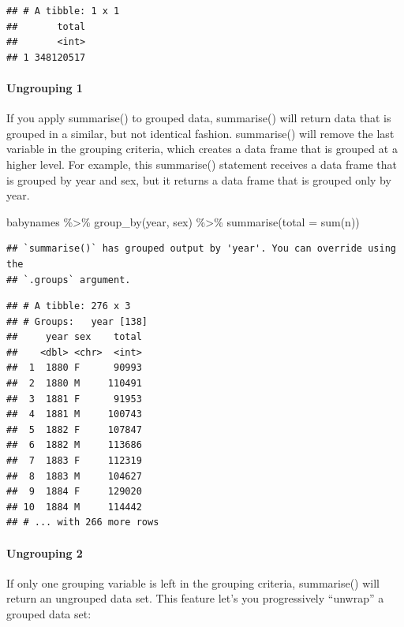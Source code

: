 \documentclass[
]{article}
\newenvironment{Shaded}{\begin{snugshade}}{\end{snugshade}}
\newcommand{\AttributeTok}[1]{\textcolor[rgb]{0.77,0.63,0.00}{#1}}
\newcommand{\FunctionTok}[1]{\textcolor[rgb]{0.00,0.00,0.00}{#1}}
\newcommand{\NormalTok}[1]{#1}
\newcommand{\SpecialCharTok}[1]{\textcolor[rgb]{0.00,0.00,0.00}{#1}}
\begin{document}
\begin{verbatim}
## # A tibble: 1 x 1
##       total
##       <int>
## 1 348120517
\end{verbatim}

\hypertarget{ungrouping-1}{%
\paragraph{Ungrouping 1}\label{ungrouping-1}}

If you apply summarise() to grouped data, summarise() will return data
that is grouped in a similar, but not identical fashion. summarise()
will remove the last variable in the grouping criteria, which creates a
data frame that is grouped at a higher level. For example, this
summarise() statement receives a data frame that is grouped by year and
sex, but it returns a data frame that is grouped only by year.

\begin{Shaded}
\begin{Highlighting}[]
\NormalTok{babynames }\SpecialCharTok{\%\textgreater{}\%}
  \FunctionTok{group\_by}\NormalTok{(year, sex) }\SpecialCharTok{\%\textgreater{}\%} 
  \FunctionTok{summarise}\NormalTok{(}\AttributeTok{total =} \FunctionTok{sum}\NormalTok{(n))}
\end{Highlighting}
\end{Shaded}

\begin{verbatim}
## `summarise()` has grouped output by 'year'. You can override using the
## `.groups` argument.
\end{verbatim}

\begin{verbatim}
## # A tibble: 276 x 3
## # Groups:   year [138]
##     year sex    total
##    <dbl> <chr>  <int>
##  1  1880 F      90993
##  2  1880 M     110491
##  3  1881 F      91953
##  4  1881 M     100743
##  5  1882 F     107847
##  6  1882 M     113686
##  7  1883 F     112319
##  8  1883 M     104627
##  9  1884 F     129020
## 10  1884 M     114442
## # ... with 266 more rows
\end{verbatim}

\hypertarget{ungrouping-2}{%
\paragraph{Ungrouping 2}\label{ungrouping-2}}

If only one grouping variable is left in the grouping criteria,
summarise() will return an ungrouped data set. This feature let's you
progressively ``unwrap'' a grouped data set:
\end{document}
